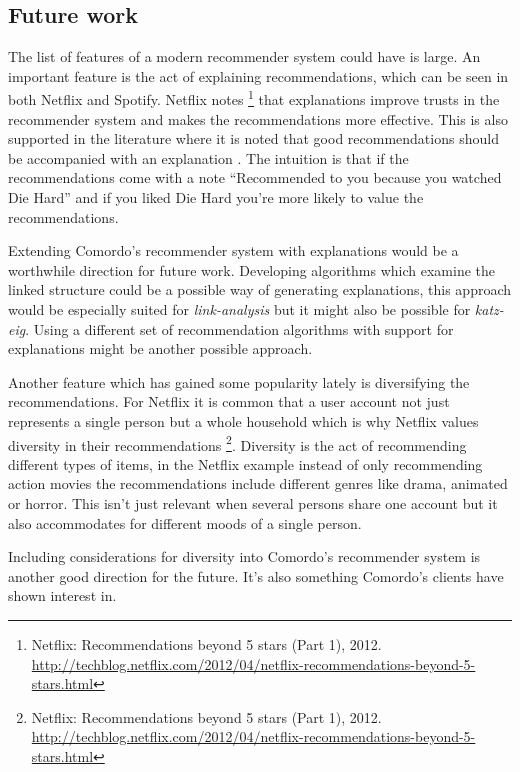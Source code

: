\subsection{Future work}

The list of features of a modern recommender system could have is large. An important feature is the act of explaining recommendations, which can be seen in both Netflix and Spotify. Netflix notes
\footnote{
Netflix: Recommendations beyond 5 stars (Part 1), 2012.
\url{http://techblog.netflix.com/2012/04/netflix-recommendations-beyond-5-stars.html}
}
that explanations improve trusts in the recommender system and makes the recommendations more effective. This is also supported in the literature where it is noted that good recommendations should be accompanied with an explanation \citep{hu2008collaborative}.
The intuition is that if the recommendations come with a note ``Recommended to you because you watched Die Hard'' and if you liked Die Hard you're more likely to value the recommendations.

Extending Comordo's recommender system with explanations would be a worthwhile direction for future work. Developing algorithms which examine the linked structure could be a possible way of generating explanations, this approach would be especially suited for \textit{link-analysis} but it might also be possible for \textit{katz-eig}. Using a different set of recommendation algorithms with support for explanations \citep{hu2008collaborative} might be another possible approach.

Another feature which has gained some popularity lately \citep{bobadilla2013recommender} is diversifying the recommendations. For Netflix it is common that a user account not just represents a single person but a whole household which is why Netflix values diversity in their recommendations
\footnote{
Netflix: Recommendations beyond 5 stars (Part 1), 2012.
\url{http://techblog.netflix.com/2012/04/netflix-recommendations-beyond-5-stars.html}
}.
Diversity is the act of recommending different types of items, in the Netflix example instead of only recommending action movies the recommendations include different genres like drama, animated or horror. This isn't just relevant when several persons share one account but it also accommodates for different moods of a single person.

Including considerations for diversity into Comordo's recommender system is another good direction for the future. It's also something Comordo's clients have shown interest in.

